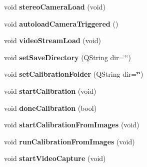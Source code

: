 \begin{DoxyCompactItemize}
\item 
\hypertarget{class_main_window_a6639d5556a72805286bd60d4275c8e65}{}void {\bfseries stereo\+Camera\+Load} (void)\label{class_main_window_a6639d5556a72805286bd60d4275c8e65}

\item 
\hypertarget{class_main_window_a5845d8958b4dc340a7c886459882f135}{}void {\bfseries autoload\+Camera\+Triggered} ()\label{class_main_window_a5845d8958b4dc340a7c886459882f135}

\item 
\hypertarget{class_main_window_a457c7288fead0321904dff005df9a467}{}void {\bfseries video\+Stream\+Load} (void)\label{class_main_window_a457c7288fead0321904dff005df9a467}

\item 
\hypertarget{class_main_window_ac128415fac38f4dccff64e7c7ac0370e}{}void {\bfseries set\+Save\+Directory} (Q\+String dir=\char`\"{}\char`\"{})\label{class_main_window_ac128415fac38f4dccff64e7c7ac0370e}

\item 
\hypertarget{class_main_window_af5da466f6fb4fb8bb589c26241eb4dc6}{}void {\bfseries set\+Calibration\+Folder} (Q\+String dir=\char`\"{}\char`\"{})\label{class_main_window_af5da466f6fb4fb8bb589c26241eb4dc6}

\item 
\hypertarget{class_main_window_aaaa53df1168d18abc91da7cb420eb52e}{}void {\bfseries start\+Calibration} (void)\label{class_main_window_aaaa53df1168d18abc91da7cb420eb52e}

\item 
\hypertarget{class_main_window_a4d02672408e45d3f658f37eb20cfdbd8}{}void {\bfseries done\+Calibration} (bool)\label{class_main_window_a4d02672408e45d3f658f37eb20cfdbd8}

\item 
\hypertarget{class_main_window_ab9b7dc765659c5de33f0a4e5d0a4bcb7}{}void {\bfseries start\+Calibration\+From\+Images} (void)\label{class_main_window_ab9b7dc765659c5de33f0a4e5d0a4bcb7}

\item 
\hypertarget{class_main_window_ab02597ed7d258c97fe56e9a47c7e698b}{}void {\bfseries run\+Calibration\+From\+Images} (void)\label{class_main_window_ab02597ed7d258c97fe56e9a47c7e698b}

\item 
\hypertarget{class_main_window_a25d0b0dfc95142456b966fd83b72a26a}{}void {\bfseries start\+Video\+Capture} (void)\label{class_main_window_a25d0b0dfc95142456b966fd83b72a26a}


\end{DoxyCompactItemize}

